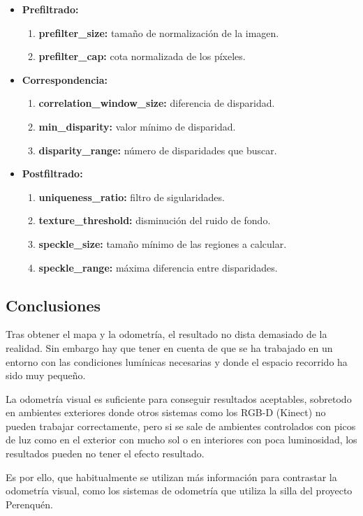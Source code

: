 \begin{itemize}
  \item \textbf{Prefiltrado:}
  \begin{enumerate}
    \item \textbf{prefilter\_size:} tamaño de normalización de la imagen.
    \item \textbf{prefilter\_cap:} cota normalizada de los píxeles.
  \end{enumerate}
  \item \textbf{Correspondencia:}
  \begin{enumerate}
    \item \textbf{correlation\_window\_size:} diferencia de disparidad. 
    \item \textbf{min\_disparity:} valor mínimo de disparidad.
    \item \textbf{disparity\_range:} número de disparidades que buscar.
  \end{enumerate}
  \item \textbf{Postfiltrado:}
  \begin{enumerate}
    \item \textbf{uniqueness\_ratio:} filtro de sigularidades.
    \item \textbf{texture\_threshold:} disminución del ruido de fondo.
    \item \textbf{speckle\_size:} tamaño mínimo de las regiones a calcular.
    \item \textbf{speckle\_range:} máxima diferencia entre disparidades.
  \end{enumerate}
\end{itemize}

\subsection{Conclusiones}

Tras obtener el mapa y la odometría, el resultado no dista demasiado de la
realidad. Sin embargo hay que tener en cuenta de que se ha trabajado en un
entorno con las condiciones lumínicas necesarias y donde el espacio recorrido ha
sido muy pequeño.

La odometría visual es suficiente para conseguir resultados aceptables,
sobretodo en ambientes exteriores donde otros sistemas como los RGB-D (Kinect)
no pueden trabajar correctamente, pero si se sale de ambientes controlados con
picos de luz como en el exterior con mucho sol o en interiores con poca
luminosidad, los resultados pueden no tener el efecto resultado.

Es por ello, que habitualmente se utilizan más información para contrastar la
odometría visual, como los sistemas de odometría que utiliza la silla del
proyecto Perenquén.

